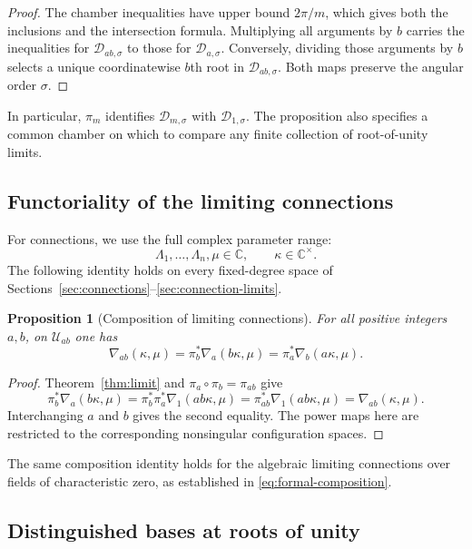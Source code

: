 \documentclass[12pt]{amsart}
\newtheorem{prop}[thm]{Proposition}
\theoremstyle{definition}
\numberwithin{equation}{section}
\theoremstyle{definition}
\let\mc\mathcal
\let\ka\kappa
\let\La\Lambda
\let\si\sigma
\def\C{{\mathbb C}}
\def\beq{\begin{equation}}
\def\eeq{\end{equation}}
\begin{document}
\begin{proof}
The chamber inequalities have upper bound $2\pi/m$, which gives
both the inclusions and the intersection formula. Multiplying all
arguments by $b$ carries the inequalities for $\mc D_{ab,\si}$
to those for $\mc D_{a,\si}$. Conversely, dividing those arguments
by $b$ selects a unique coordinatewise $b$th root in
$\mc D_{ab,\si}$. Both maps preserve the angular order $\si$.
\end{proof}

In particular, $\pi_m$ identifies $\mc D_{m,\si}$ with
$\mc D_{1,\si}$. The proposition also specifies a common chamber
on which to compare any finite collection of root-of-unity limits.

\subsection{Functoriality of the limiting connections}
\label{subsec:functorial-connections}

For connections, we use the full complex parameter range:
\[
 \La_1,\ldots,\La_n,\mu\in\C,\qquad \ka\in\C^\times.
\]
The following identity holds on every fixed-degree space of
Sections~\ref{sec:connections}--\ref{sec:connection-limits}.

\begin{prop}[Composition of limiting connections]
\label{prop:connection-composition}
For all positive integers $a,b$, on $\mc U_{ab}$ one has
\beq\label{eq:connection-composition}
 \boxed{\quad
 \nabla_{ab}(\ka,\mu)
 =\pi_b^*\nabla_a(b\ka,\mu)
 =\pi_a^*\nabla_b(a\ka,\mu).
 \quad}
\eeq
\end{prop}

\begin{proof}
Theorem~\ref{thm:limit} and $\pi_a\circ\pi_b=\pi_{ab}$ give
\[
 \pi_b^*\nabla_a(b\ka,\mu)
 =\pi_b^*\pi_a^*\nabla_1(ab\ka,\mu)
 =\pi_{ab}^*\nabla_1(ab\ka,\mu)
 =\nabla_{ab}(\ka,\mu).
\]
Interchanging $a$ and $b$ gives the second equality. The power
maps here are restricted to the corresponding nonsingular
configuration spaces.
\end{proof}

The same composition identity holds for the algebraic limiting
connections over fields of characteristic zero, as established in
\eqref{eq:formal-composition}.

\subsection{Distinguished bases at roots of unity}
\label{subsec:functorial-solutions}
\end{document}
